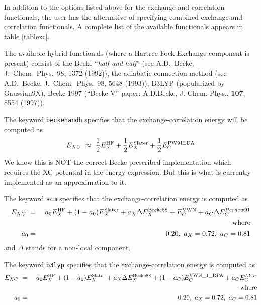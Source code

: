 In addition to the options listed above for the exchange and correlation
functionals, the user has the alternative of specifying combined exchange and 
correlation functionals. A complete list of the available functionals
appears in table \ref{tablexc}.

  The available hybrid functionals 
(where a Hartree-Fock Exchange component is present) consist of the Becke
``{\it half and half}'' (see A.D.~Becke, J.~Chem.~Phys.~98, 1372 (1992)), the
adiabatic connection method (see A.D.~Becke, J.~Chem.~Phys.~98, 5648
(1993)),  B3LYP (popularized by Gaussian9X), Becke 1997 
(``Becke V'' paper: A.D.Becke, J. Chem. Phys., {\bf 107}, 8554 (1997)).


The keyword \verb+beckehandh+ specifies that the exchange-correlation energy will be
computed as 
\begin{eqnarray*}
E_{XC} \ \approx \ \frac{1}{2} E^{\rm HF}_X + \frac{1}{2} E^{\rm
  Slater}_{X} + \frac{1}{2} E^{\rm PW91LDA}_{C}
\end{eqnarray*}
We know this is NOT the correct Becke prescribed implementation which
requires the XC potential in the energy expression.  But this is what
is currently implemented as an approximation to it.

%

The keyword \verb+acm+ specifies that the exchange-correlation energy
is computed as
\begin{eqnarray*}
E_{XC} \ &=& \ a_0 E^{\rm HF}_X + (1-a_0) E^{\rm Slater}_{X} +
a_X \Delta E^{\rm Becke88}_{X} + E^{\rm VWN}_C + a_C \Delta E^{Perdew91}_C \\
& &{\rm where } \\
a_0 &=& 0.20, \ a_X = 0.72, \ a_C = 0.81
\end{eqnarray*}
and $\Delta$ stands for a non-local component.


The keyword \verb+b3lyp+ specifies that the exchange-correlation energy
is computed as
\begin{eqnarray*}
E_{XC} \ &=& \ a_0 E^{\rm HF}_X + (1-a_0) E^{\rm Slater}_{X} +
a_X \Delta E^{\rm Becke88}_{X} + (1-a_C)E^{\rm VWN\_1\_RPA}_C + a_C E^{LYP}_C \\
& &{\rm where } \\
a_0 &=& 0.20, \ a_X = 0.72, \ a_C = 0.81
\end{eqnarray*}


